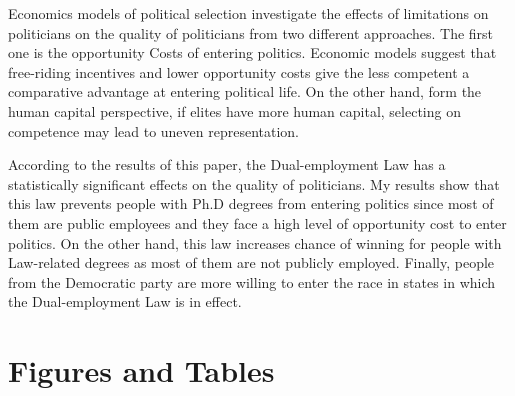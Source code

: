 \documentclass[12pt,english]{article}
\begin{document}
Economics models of political selection investigate the effects of limitations on politicians on the quality of politicians from two different approaches. The first one is  the opportunity Costs of entering politics. Economic models suggest that free-riding
incentives and lower opportunity costs give the less competent a
comparative advantage at entering political life. On the other hand, form the human capital perspective, if elites have more human capital, selecting on
competence may lead to uneven representation.

According to the results of this paper, the Dual-employment Law has a statistically significant effects on the quality of politicians. My results show that this law prevents people with Ph.D degrees from entering politics since most of them are public employees and they face a high level of opportunity cost to enter politics. On the other hand, this law increases chance of winning for people with Law-related degrees as most of them are not publicly employed. Finally, people from the Democratic party are more willing to enter the race in states in which the Dual-employment Law is in effect. 

\newpage

\nocite{*}


\vfill
\pagebreak{}
\begin{spacing}{1.0}
\end{spacing}

\vfill
\pagebreak{}
\clearpage


\section*{Figures and Tables}\label{sec:figTables}
\end{document}
